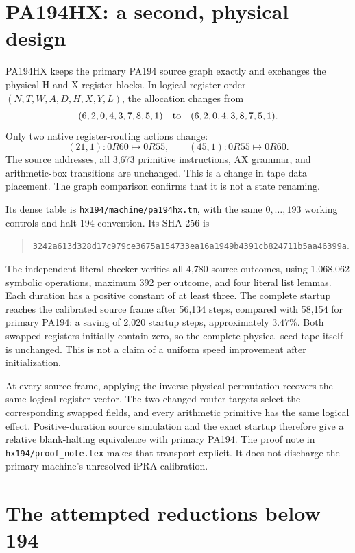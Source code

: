 \documentclass[11pt]{article}
\newcommand{\file}[1]{\nolinkurl{#1}}
\begin{document}
\section{PA194HX: a second, physical design}

PA194HX keeps the primary PA194 source graph exactly and exchanges the
physical H and X register blocks. In logical register order
$(N,T,W,A,D,H,X,Y,L)$, the allocation changes from
\[
 (6,2,0,4,3,7,8,5,1)\quad\hbox{to}\quad(6,2,0,4,3,8,7,5,1).
\]
Only two native register-routing actions change:
\[
 (21,1):0R60\longmapsto0R55,
 \qquad (45,1):0R55\longmapsto0R60.
\]
The source addresses, all 3,673 primitive instructions, AX grammar, and
arithmetic-box transitions are unchanged. This is a change in tape data
placement. The graph comparison confirms that it is not a state renaming.

Its dense table is \file{hx194/machine/pa194hx.tm}, with the same
$0,\ldots,193$ working controls and halt 194 convention. Its SHA-256 is
\begin{quote}\small\nolinkurl{3242a613d328d17c979ce3675a154733ea16a1949b4391cb824711b5aa46399a}.\end{quote}

The independent literal checker verifies all 4,780 source outcomes,
using 1,068,062 symbolic operations, maximum 392 per outcome, and four
literal list lemmas. Each duration has a positive constant of at least
three. The complete startup reaches the calibrated source frame after
56,134 steps, compared with 58,154 for primary PA194: a saving of 2,020
startup steps, approximately $3.47\%$. Both swapped registers initially
contain zero, so the complete physical seed tape itself is unchanged.
This is not a claim of a uniform speed improvement after initialization.

At every source frame, applying the inverse physical permutation recovers
the same logical register vector. The two changed router targets select
the corresponding swapped fields, and every arithmetic primitive has the
same logical effect. Positive-duration source simulation and the exact
startup therefore give a relative blank-halting equivalence with primary
PA194. The proof note in \file{hx194/proof_note.tex} makes that transport
explicit. It does not discharge the primary machine's unresolved iPRA
calibration.

\section{The attempted reductions below 194}
\end{document}

